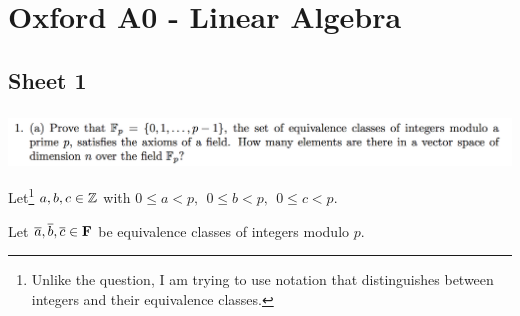 \section{Oxford A0 - Linear Algebra}

\subsection{Sheet 1}

\subsubsection{} %
\begin{mdframed}
  \includegraphics[width=450pt]{img/linear-algebra-a0-1-1-a.png}\\
\end{mdframed}

Let\footnote{Unlike the question, I am trying to use notation that
  distinguishes between integers and their equivalence classes.}
$a, b, c \in \mathbb{Z}$ with $0 \leq a < p, ~~ 0 \leq b < p, ~~ 0 \leq c < p$.

Let $\overline a, \overline b, \overline c \in \mathbf{F}$ be equivalence classes of integers modulo $p$.

